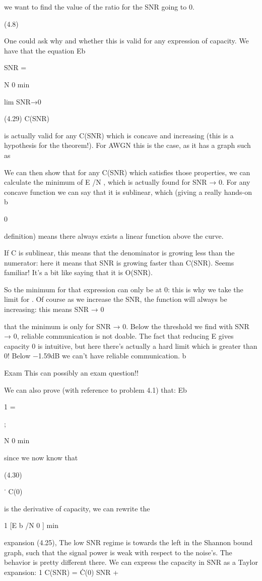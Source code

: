 {{{{{we want to find the value of the ratio for the SNR going to 0.

(4.8)

One could ask why and whether this is valid for any expression of capacity. We have that the equation Eb

SNR
=

N 0 min

lim SNR→0

(4.29)
C(SNR)

is actually valid for any C(SNR) which is concave and increasing (this is a hypothesis for the theorem!). For AWGN this is the case, as it has a graph such as

We can then show that for any C(SNR) which satisfies those properties, we can calculate the minimum of E /N , which is actually found for SNR → 0.
For any concave function we can say that it is sublinear, which (giving a really hands-on b

0

definition) means there always exists a linear function above the curve.

If C is sublinear, this means that the denominator is growing less than the numerator:
here it means that SNR is growing faster than C(SNR).
​Seems familiar!
It's a bit like saying that it is O(SNR).

So the minimum for that expression can only be at 0: this is why we take the limit for
.
Of course as we increase the SNR, the function will always be increasing: this means SNR → 0

that the minimum is only for SNR → 0.
Below the threshold we find with SNR → 0, reliable communication is not doable. The fact that reducing E gives capacity 0 is intuitive, but here there's actually a hard limit which is greater than 0! Below −1.59dB we can't have reliable communication.
b

Exam This can possibly an exam question!!

We can also prove (with reference to problem 4.1) that:
Eb

1
=

;

N 0 min

since we now know that

(4.30)

˙
C(0)

is the derivative of capacity, we can rewrite the

1
[E b /N 0 ] min

expansion (4.25),
The low SNR regime is towards the left in the Shannon bound graph, such that the signal power is weak with respect to the noise's. The behavior is pretty different there. We can express the capacity in SNR as a Taylor expansion:
1 C(SNR) = Ċ(0) SNR +

}}}}}
